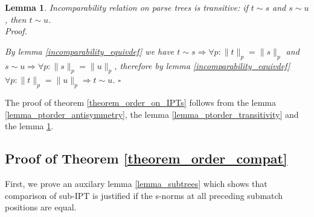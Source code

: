 \documentclass[AMA,STIX1COL]{WileyNJD-v2}
\newtheorem{XLem}{Lemma}
\begin{document}
    \begin{XLem}\label{lemma_ptorder_transitivity_of_incomparability}
    Incomparability relation on parse trees is transitive: if $t \sim s$ and $s \sim u$, then $t \sim u$.
    \\
    Proof.

    By lemma \ref{incomparability_equivdef} we have
    $t \sim s \Rightarrow \forall p : \|t\|_p = \|s\|_p$ and
    $s \sim u \Rightarrow \forall p : \|s\|_p = \|u\|_p$,
    therefore by lemma \ref{incomparability_equivdef} $\forall p : \|t\|_p = \|u\|_p \Rightarrow t \sim u$.
    $\square$
    \end{XLem}

The proof of theorem \ref{theorem_order_on_IPTs}
follows from
the lemma \ref{lemma_ptorder_antisymmetry},
the lemma \ref{lemma_ptorder_transitivity} and
the lemma \ref{lemma_ptorder_transitivity_of_incomparability}.


\subsection*{Proof of Theorem \ref{theorem_order_compat}}

First, we prove an auxilary lemma \ref{lemma_subtrees} which
shows that comparison of sub-IPT is justified
if the s-norms at all preceding submatch positions are equal.
\end{document}
